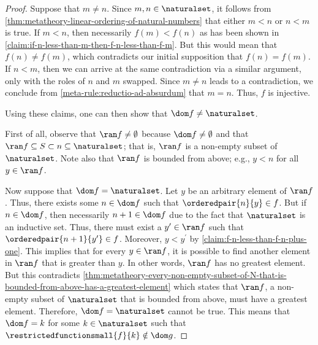 \begin{proof}
    \vspace{0.3cm}
    \noindent
    Suppose that \( m \neq n \).
    Since \( m, n \in \naturalset \), it follows from \cref{thm:metatheory-linear-ordering-of-natural-numbers} that either \( m < n \) or \( n < m \) is true.
    If \( m < n \), then necessarily \( f(m) < f(n) \) as has been shown in \cref{claim:if-n-less-than-m-then-f-n-less-than-f-m}.
    But this would mean that \( f(n) \neq f(m) \), which contradicts our initial supposition that \( f(n) = f(m) \).
    If \( n < m \), then we can arrive at the same contradiction via a similar argument, only with the roles of \( n \) and \( m \) swapped.
    Since \( m \neq n \) leads to a contradiction, we conclude from \cref{meta-rule:reductio-ad-absurdum} that \( m = n \).
    Thus, \( f \) is injective.

    \vspace{0.3cm}
    \noindent
    Using these claims, one can then show that \( \dom f \neq \naturalset \).

    \vspace{0.3cm}
    \noindent
    First of all, observe that \( \ran f \neq \emptyset \) because \( \dom f \neq \emptyset \) and that \( \ran f \subseteq S \subset n \subseteq \naturalset \);
    that is, \( \ran f \) is a non-empty subset of \( \naturalset \).
    Note also that \( \ran f \) is bounded from above; e.g., \( y < n \) for all \( y \in \ran f\).

    \vspace{0.3cm}
    \noindent
    Now suppose that \( \dom f = \naturalset \).
    Let \( y \) be an arbitrary element of \( \ran f \).
    Thus, there exists some \( n \in \dom f \) such that \( \orderedpair{n}{y} \in f \).
    But if \( n \in \dom f \), then necessarily \( n + 1 \in \dom f \) due to the fact that \( \naturalset \) is an inductive set.
    Thus, there must exist a \( y^{\prime} \in \ran f \) such that \( \orderedpair{n + 1}{y^{\prime}} \in f \).
    Moreover, \( y < y^{\prime} \) by \cref{claim:f-n-less-than-f-n-plus-one}.
    This implies that for every \( y \in \ran f \), it is possible to find another element in \( \ran f \) that is greater than \( y \).
    In other words, \( \ran f \) has no greatest element.
    But this contradicts \cref{thm:metatheory-every-non-empty-subset-of-N-that-is-bounded-from-above-has-a-greatest-element} which states that
    \( \ran f \), a non-empty subset of \( \naturalset \) that is bounded from above, must have a greatest element.
    Therefore, \( \dom f = \naturalset \) cannot be true.
    This means that \( \dom f = k \) for some \( k \in \naturalset \) such that \( \restrictedfunctionsmall{f}{k} \notin \dom g \).


\end{proof}
